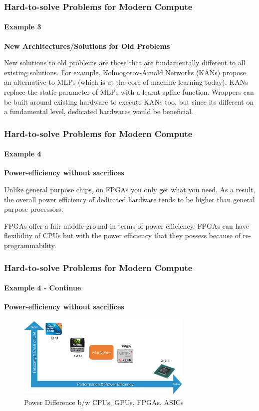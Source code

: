 \documentclass{beamer}
\begin{document}
\begin{frame}[fragile]
  \frametitle{Hard-to-solve Problems for Modern Compute}
  \framesubtitle{Example 3}
  \textbf{New Architectures/Solutions for Old Problems}

  New solutions to old problems are those that are fundamentally different to
  all existing solutions. For example, Kolmogorov-Arnold Networks (KANs) propose
  an alternative to MLPs (which is at the core of machine learning today). KANs
  replace the static parameter of MLPs with a learnt spline function. Wrappers
  can be built around existing hardware to execute KANs too, but since its
  different on a fundamental level, dedicated hardwares would be beneficial.

\end{frame}

\begin{frame}[fragile]
  \frametitle{Hard-to-solve Problems for Modern Compute}
  \framesubtitle{Example 4}

  \textbf{Power-efficiency without sacrifices}

  Unlike general purpose chips, on FPGAs you only get what you need. As a
  result, the overall power efficiency of dedicated hardware tends to be
  higher than general purpose processors. 

  FPGAs offer a fair middle-ground in terms of power efficiency. FPGAs
  can have flexibility of CPUs but with the power efficiency that they possess
  because of re-programmability.

\end{frame}

\begin{frame}[fragile]
  \frametitle{Hard-to-solve Problems for Modern Compute}
  \framesubtitle{Example 4 - Continue}

  \textbf{Power-efficiency without sacrifices}

  \begin{figure}
    \centering
    \includegraphics[width=0.75\textwidth]{power.png}
    \caption{Power Difference b/w CPUs, GPUs, FPGAs, ASICs}
    \label{}
  \end{figure}

\end{frame}
\end{document}
